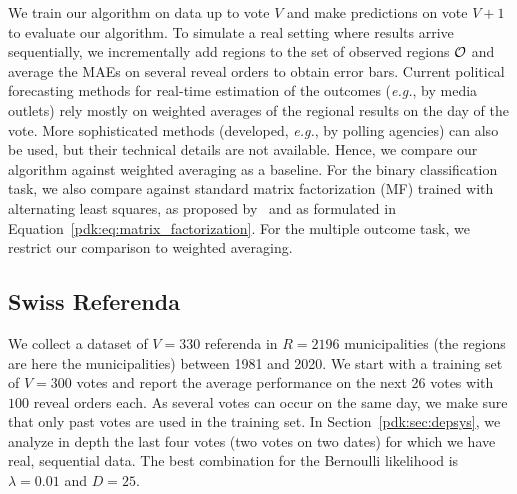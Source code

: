 We train our algorithm on data up to vote $V$ and make predictions on vote $V+1$ to evaluate our algorithm.
To simulate a real setting where results arrive sequentially, we incrementally add regions to the set of observed regions $\mathcal{O}$ and average the MAEs on several reveal orders to obtain error bars.
Current political forecasting methods for real-time estimation of the outcomes (\textit{e.g.}, by media outlets) rely mostly on weighted averages of the regional results on the day of the vote.
More sophisticated methods (developed, \textit{e.g.}, by polling agencies) can also be used, but their technical details are not available.
Hence, we compare our algorithm against weighted averaging as a baseline.
For the binary classification task, we also compare against standard matrix factorization (MF) trained with alternating least squares, as proposed by~\citet{etter2016online} and as formulated in Equation~\eqref{pdk:eq:matrix_factorization}.
For the multiple outcome task, we restrict our comparison to weighted averaging.

\subsection{Swiss Referenda}
\label{pdk:sec:swiss_referenda}

We collect a dataset of $V=330$ referenda in $R=2196$ municipalities (the regions are here the municipalities) between 1981 and 2020.
We start with a training set of $V=300$ votes and report the average performance on the next 26 votes with $100$ reveal orders each.
As several votes can occur on the same day, we make sure that only past votes are used in the training set.
In Section~\ref{pdk:sec:depsys}, we analyze in depth the last four votes (two votes on two dates) for which we have real, sequential data.
The best combination for the Bernoulli likelihood is $\lambda = 0.01 $ and $D = 25$.

